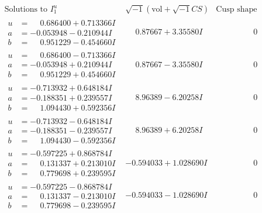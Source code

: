 \documentclass[1p]{elsarticle_modified}
\theoremstyle{definition}
\newcommand{\I}{\sqrt{-1}}
\begin{document}
$$\begin{array}{c|c|c}  
\text{Solutions to }I^u_{1}& \I (\text{vol} + \sqrt{-1}CS) & \text{Cusp shape}\\
 \hline 
\begin{aligned}
u &= \phantom{-}0.686400 + 0.713366 I \\
a &= -0.053948 - 0.210944 I \\
b &= \phantom{-}0.951229 - 0.454660 I\end{aligned}
 & \phantom{-}0.87667 + 3.35580 I & \phantom{-0.000000 } 0 \\ \hline\begin{aligned}
u &= \phantom{-}0.686400 - 0.713366 I \\
a &= -0.053948 + 0.210944 I \\
b &= \phantom{-}0.951229 + 0.454660 I\end{aligned}
 & \phantom{-}0.87667 - 3.35580 I & \phantom{-0.000000 } 0 \\ \hline\begin{aligned}
u &= -0.713932 + 0.648184 I \\
a &= -0.188351 + 0.239557 I \\
b &= \phantom{-}1.094430 + 0.592356 I\end{aligned}
 & \phantom{-}8.96389 - 6.20258 I & \phantom{-0.000000 } 0 \\ \hline\begin{aligned}
u &= -0.713932 - 0.648184 I \\
a &= -0.188351 - 0.239557 I \\
b &= \phantom{-}1.094430 - 0.592356 I\end{aligned}
 & \phantom{-}8.96389 + 6.20258 I & \phantom{-0.000000 } 0 \\ \hline\begin{aligned}
u &= -0.597225 + 0.868784 I \\
a &= \phantom{-}0.131337 + 0.213010 I \\
b &= \phantom{-}0.779698 + 0.239595 I\end{aligned}
 & -0.594033 + 1.028690 I & \phantom{-0.000000 } 0 \\ \hline\begin{aligned}
u &= -0.597225 - 0.868784 I \\
a &= \phantom{-}0.131337 - 0.213010 I \\
b &= \phantom{-}0.779698 - 0.239595 I\end{aligned}
 & -0.594033 - 1.028690 I & \phantom{-0.000000 } 0 \\ \hline\begin{aligned}

\end{aligned}
\end{array}$$
\end{document}
